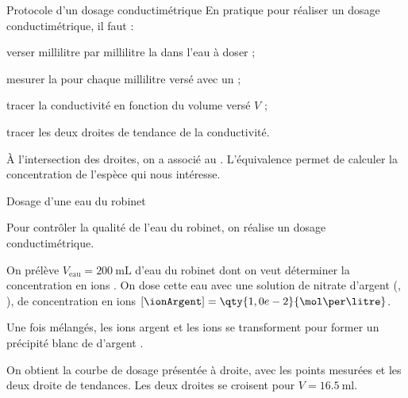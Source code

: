 \begin{doc}{Protocole d'un dosage conductimétrique}
  En pratique pour réaliser un dosage conductimétrique, il faut :
  \begin{protocole}
    \item verser millilitre par millilitre la  dans l'eau à doser ;
  \end{protocole}

  \vspace*{-18pt}
  \begin{figure}
    \hspace*{-60pt}
  \end{figure}

  \strut
  \begin{protocole}
    \item mesurer la  pour chaque millilitre versé avec un  ;
    \item tracer la conductivité en fonction du volume versé $V$ ;
    \item tracer les deux droites de tendance de la conductivité.
  \end{protocole}
  
  \vspace{4.2cm}
  \begin{importants}  
    À l'intersection des droites, on a  associé au .
    L'équivalence permet de calculer la concentration de l'espèce qui nous intéresse.
  \end{importants}
\end{doc}

\pasCorrection{\newpage}
\begin{doc}{Dosage d'une eau du robinet}
  \begin{figure}
    \vspace*{-36pt}
    \centering
  \end{figure}
  Pour contrôler la qualité de l'eau du robinet, on réalise un dosage conductimétrique.

  On prélève $V_\text{eau} = \qty{200}{\mL}$ d'eau du robinet dont on veut déterminer la concentration en ions  \chlorure.
  On dose cette eau avec une solution de nitrate d'argent (\ionArgent, \nitrate), de concentration en ions $[\ionArgent] = \qty{1,0e-2}{\mol\per\litre}$.

  Une fois mélangés, les ions argent et les ions  se transforment pour former un précipité blanc de  d'argent \chlorureDArgent.

  On obtient la courbe de dosage présentée à droite, avec les points mesurées et les deux droite de tendances.
  Les deux droites se croisent pour $V = \qty{16,5}{\ml}$.
\end{doc}

